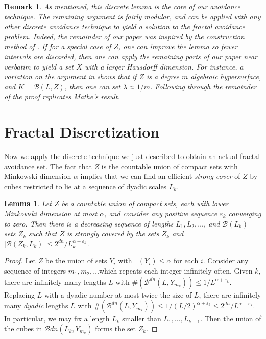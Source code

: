 \documentclass{article}
\theoremstyle{plain}
\newtheorem{lemma}{Lemma}
\theoremstyle{plain}
\newtheorem*{remark}{Remark}
\DeclareMathOperator{\lhdim}{\underline{\dim}_{\mathbf{M}}}
\begin{document}
\begin{remark}
	As mentioned, this discrete lemma is the core of our avoidance technique. The remaining argument is fairly modular, and can be applied with any other discrete avoidance technique to yield a solution to the fractal avoidance problem. Indeed, the remainder of our paper was inspired by the construction method of \cite{MalabikaRob}. If for a special case of $Z$, one can improve the lemma so fewer intervals are discarded, then one can apply the remaining parts of our paper near verbatim to yield a set $X$ with a larger Hausdorff dimension. For instance, a variation on the argument in \cite{Mathe} shows that if $Z$ is a degree $m$ algebraic hypersurface, and $K = \mathcal{B}(L,Z)$, then one can set $\lambda \approx 1/m$. Following through the remainder of the proof replicates Mathe's result.
\end{remark}

\section{Fractal Discretization}

Now we apply the discrete technique we just described to obtain an actual fractal avoidance set. The fact that $Z$ is the countable union of compact sets with Minkowski dimension $\alpha$ implies that we can find an efficient {\it strong cover} of $Z$ by cubes restricted to lie at a sequence of dyadic scales $L_k$.

\begin{lemma}
	Let $Z$ be a countable union of compact sets, each with lower Minkowski dimension at most $\alpha$, and consider any positive sequence $\varepsilon_k$ converging to zero. Then there is a decreasing sequence of lengths $L_1, L_2, \dots$, and $\mathcal{B}(L_k)$ sets $Z_k$ such that $Z$ is strongly covered by the sets $Z_k$ and $|\mathcal{B}(Z_k, L_k)| \leq 2^{dn}/L_k^{\alpha + \varepsilon_k}$.
\end{lemma}
\begin{proof}
	Let $Z$ be the union of sets $Y_i$ with $\lhdim(Y_i) \leq \alpha$ for each $i$. Consider any sequence of integers $m_1, m_2, \dots$which repeats each integer infinitely often. Given $k$, there are infinitely many lengths $L$ with $\#(\mathcal{B}^{dn}(L,Y_{m_k})) \leq 1/L^{\alpha + \varepsilon_k}$. Replacing $L$ with a dyadic number at most twice the size of $L$, there are infinitely many {\it dyadic} lengths $L$ with $\# (\mathcal{B}^{dn}(L,Y_{m_k})) \leq 1/(L/2)^{\alpha + \varepsilon_k} \leq 2^{dn}/L^{\alpha + \varepsilon_k}$. In particular, we may fix a length $L_k$ smaller than $L_1, \dots, L_{k-1}$. Then the union of the cubes in $\mathcal{B}{dn}(L_k,Y_{m_k})$ forms the set $Z_k$.
\end{proof}
\end{document}
